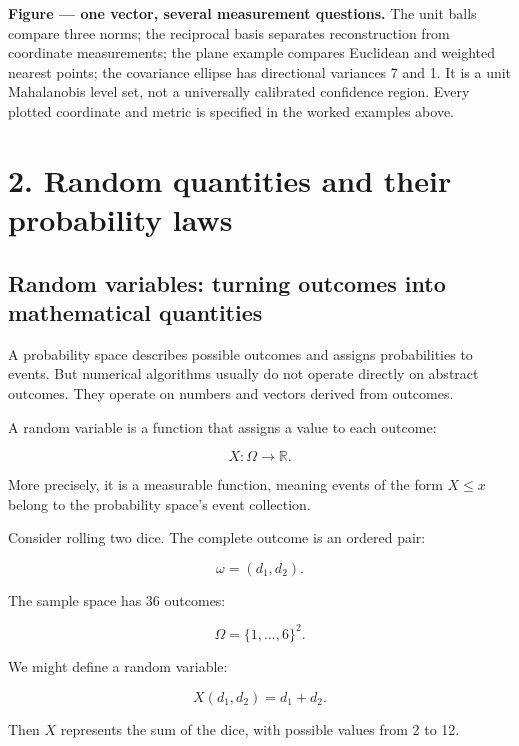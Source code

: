 \textbf{Figure --- one vector, several measurement questions.} The unit balls compare three norms; the reciprocal basis separates reconstruction from coordinate measurements; the plane example compares Euclidean and weighted nearest points; the covariance ellipse has directional variances 7 and 1. It is a unit Mahalanobis level set, not a universally calibrated confidence region. Every plotted coordinate and metric is specified in the worked examples above.

\section{2. Random quantities and their probability laws}\label{02-foundations-ii-ch023-random-quantities-and-their-probability-laws}

\hypertarget{02-foundations-ii-ch023-random-quantities-and-their-probability-laws}{}

\subsection{Random variables: turning outcomes into mathematical quantities}\label{02-foundations-ii-ch023-random-variables-turning-outcomes-into-mathematical-quantities}

\hypertarget{02-foundations-ii-ch023-random-variables-turning-outcomes-into-mathematical-quantities}{}

A probability space describes possible outcomes and assigns probabilities to events. But numerical algorithms usually do not operate directly on abstract outcomes. They operate on numbers and vectors derived from outcomes.

A random variable is a function that assigns a value to each outcome:

\[
 \boxed{X:\Omega\rightarrow\mathbb R}.
\]

More precisely, it is a measurable function, meaning events of the form \(X\le x\) belong to the probability space's event collection.

Consider rolling two dice. The complete outcome is an ordered pair:

\[
 \omega=(d_1,d_2).
\]

The sample space has 36 outcomes:

\[
 \Omega=\{1,\ldots,6\}^2.
\]

We might define a random variable:

\[
 X(d_1,d_2)=d_1+d_2.
\]

Then \(X\) represents the sum of the dice, with possible values from 2 to 12.

